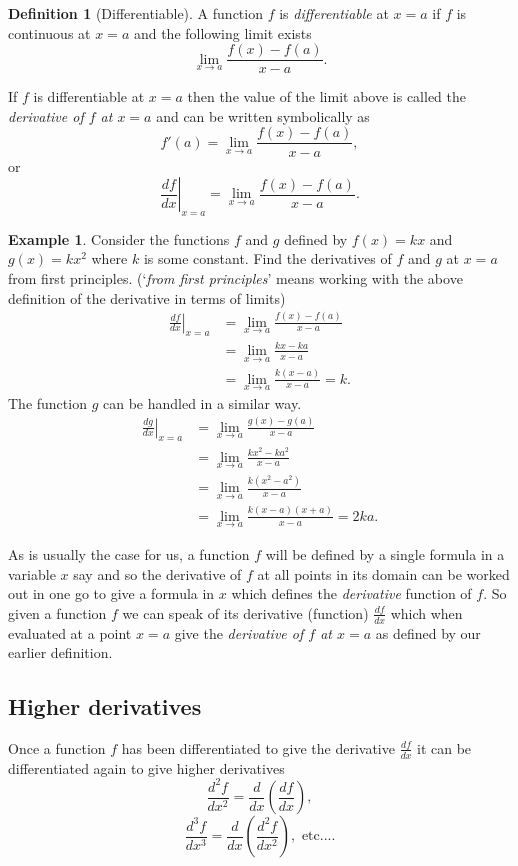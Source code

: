 \documentclass[extrafontsizes, twoside, a4paper]{memoir}
\theoremstyle{plain}%
\theoremstyle{definition}
\newtheorem{defn}{Definition}[chapter]
\newtheorem{exmp}{Example}[chapter]
\theoremstyle{remark}
\begin{document}
\begin{defn}[Differentiable]
A function $f$ is \emph{differentiable} at $x=a$ if $f$ is continuous at $x=a$ and the following limit exists
$$ \lim_{x \to a} \frac{f(x)-f(a)}{x-a} .$$
\end{defn}
If $f$ is differentiable at $x=a$ then the value of the limit above is called the \emph{derivative of $f$ at $x=a$} and can be written symbolically as
$$ f'(a) = \lim_{x \to a} \frac{f(x)-f(a)}{x-a} ,$$
or
$$ \left. \frac{df}{dx} \right |_{x=a} = \lim_{x \to a} \frac{f(x)-f(a)}{x-a} .$$

\begin{exmp}
Consider the functions $f$ and $g$ defined by $f(x)=kx$ and $g(x)=kx^2$ where $k$ is some constant. Find the derivatives of $f$ and $g$ at $x=a$ from first principles. (`\textit{from first principles}' means working with the above definition of the derivative in terms of limits)
\begin{align*}
\left. \frac{df}{dx} \right |_{x=a} &= \lim_{x \to a} \frac{f(x)-f(a)}{x-a} \\
&= \lim_{x \to a} \frac{kx - ka}{x-a} \\
&= \lim_{x \to a} \frac{k(x-a)}{x-a} = k.
\end{align*}
The function $g$ can be handled in a similar way.
\begin{align*}
\left. \frac{dg}{dx} \right |_{x=a} &= \lim_{x \to a} \frac{g(x)-g(a)}{x-a} \\
&= \lim_{x \to a} \frac{kx^2 - ka^2}{x-a} \\
&= \lim_{x \to a} \frac{k(x^2-a^2)}{x-a} \\
&= \lim_{x \to a} \frac{k(x-a)(x+a)}{x-a} = 2ka.
\end{align*}
\end{exmp}

As is usually the case for us, a function $f$ will be defined by a single formula in a variable $x$ say and so the derivative of $f$ at all points in its domain can be worked out in one go to give a formula in $x$ which defines the \emph{derivative} function of $f$. So given a function $f$ we can speak of its derivative (function) $\frac{df}{dx}$ which when evaluated at a point $x=a$ give the \emph{derivative of $f$ at $x=a$} as defined by our earlier definition.

\subsection{Higher derivatives}
Once a function $f$ has been differentiated to give the derivative $\frac{df}{dx}$ it can be differentiated again to give higher derivatives
$$\frac{d^2f}{dx^2} = \frac{d}{dx} \left ( \frac{df}{dx} \right ),$$
$$\frac{d^3f}{dx^3} = \frac{d}{dx} \left ( \frac{d^2f}{dx^2} \right ), \text{ etc....}$$
\end{document}
